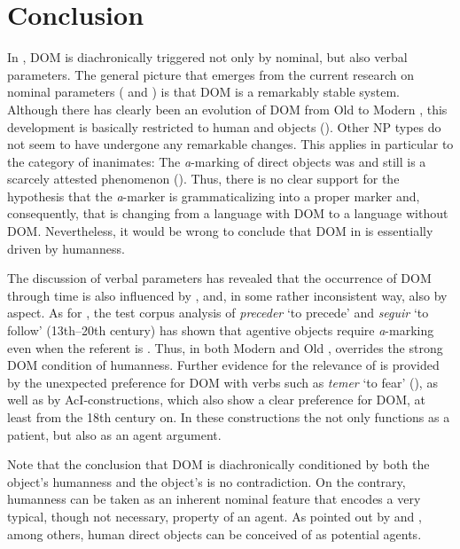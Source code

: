 \documentclass[output=paper]{LSP/langsci}
\begin{document}
\section{Conclusion}\label{08-ga-sec:5}

In , DOM is diachronically triggered not only by nominal, but also verbal parameters. The general picture that emerges from the current research on nominal parameters ( and ) is that DOM is a remarkably stable system. Although there has clearly been an evolution of DOM from Old to Modern , this development is basically restricted to human  and  objects (\cf {}). Other NP types do not seem to have undergone any remarkable changes. This applies in particular to the category of inanimates: The \textit{a}-marking of  direct objects was and still is a scarcely attested phenomenon (\cf {}). Thus, there is no clear support for the hypothesis that the \textit{a}-marker is grammaticalizing into a proper  marker and, consequently, that  is changing from a language with DOM to a language without DOM. Nevertheless, it would be wrong to conclude that DOM in  is essentially driven by humanness.

The discussion of verbal parameters has revealed that the occurrence of DOM through time is also influenced by ,  and, in some rather inconsistent way, also by aspect. As for , the test corpus analysis of \textit{preceder} ‘to precede’ and \textit{seguir} ‘to follow’ (13th--20th century) has shown that agentive objects require \textit{a}-marking even when the referent is . Thus, in both Modern and Old ,  overrides the strong DOM condition of humanness. Further evidence for the relevance of  is provided by the unexpected preference for DOM with verbs such as \textit{temer} ‘to fear’ (\cf \citealt[613]{vonHeusingeretal2011Affectedness}), as well as by AcI-constructions, which also show a clear preference for DOM, at least from the 18th century on. In these constructions the  not only functions as a patient, but also as an agent argument. 

Note that the conclusion that DOM is diachronically conditioned by both the object’s humanness and the object’s  is no contradiction. On the contrary, humanness can be taken as an inherent nominal feature that encodes a very typical, though not necessary, property of an agent. As pointed out by \citet[398]{Delbecque1998Frames} and \citet[78--79]{Primus2012Animacy}, among others, human direct objects can be conceived of as potential agents.
\end{document}
